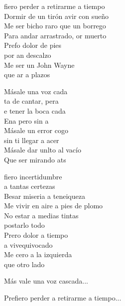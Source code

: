 \begin{cancion}%
	fiero perder a retirarme a tiempo\\
	Dormir de un tirón avir con sueño\\
	Me ser bicho raro que un borrego\\
	Para andar arrastrado, or muerto\\
	\jump
	Prefo dolor de pies\\
	por an descalzo\\
	Me ser un John Wayne \\
	que ar a plazos \jump\\
	\begin{chorus}%
		Másale una voz cada\\
		ta de cantar, pera\\
		e tener la boca cada\\
		Ena pero sin a\\
		Másale un error cogo\\
		 sin ti llegar a acer\\
		Másale dar unlto al vacío  \\
		Que ser mirando ats\jump\\
	\end{chorus}%
	fiero incertidumbre \\
	\jump
a tantas certezas\\
	Besar miseria a teneiqueza\\
	Me vivir en aire a pies de plomo\\
	\jump
No estar a medias tintas \\
	postarlo todo\\
	\jump
	Prero dolor a tiempo \\
	a vivequivocado\\
	Me cero a la izquierda \\
	que otro lado\jump\\
	\begin{chorus}%
	Más vale una voz cascada...\jump\\
	\end{chorus}%
Prefiero perder a retirarme a tiempo...\\
\end{cancion}%
